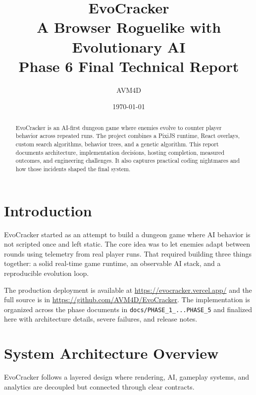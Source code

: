 \documentclass[11pt,a4paper,twoside]{article}
\begin{document}
\title{
\textbf{EvoCracker}\\[3pt]
{\large A Browser Roguelike with Evolutionary AI}\\[10pt]
\Large Phase 6 Final Technical Report
}
\author{AVM4D}
\date{\today}
\maketitle
\thispagestyle{empty}

\begin{abstract}
EvoCracker is an AI-first dungeon game where enemies evolve to counter player behavior across repeated runs.
The project combines a PixiJS runtime, React overlays, custom search algorithms, behavior trees, and a genetic algorithm.
This report documents architecture, implementation decisions, hosting completion, measured outcomes, and engineering challenges.
It also captures practical coding nightmares and how those incidents shaped the final system.
\end{abstract}

\tableofcontents
\clearpage

\section{Introduction}

EvoCracker started as an attempt to build a dungeon game where AI behavior is not scripted once and left static.
The core idea was to let enemies adapt between rounds using telemetry from real player runs.
That required building three things together: a solid real-time game runtime, an observable AI stack, and a reproducible evolution loop.

The production deployment is available at \url{https://evocracker.vercel.app/} and the full source is in \url{https://github.com/AVM4D/EvoCracker}.
The implementation is organized across the phase documents in \texttt{docs/PHASE\_1\_...PHASE\_5} and finalized here with architecture details, severe failures, and release notes.

\section{System Architecture Overview}

EvoCracker follows a layered design where rendering, AI, gameplay systems, and analytics are decoupled but connected through clear contracts.
\end{document}
